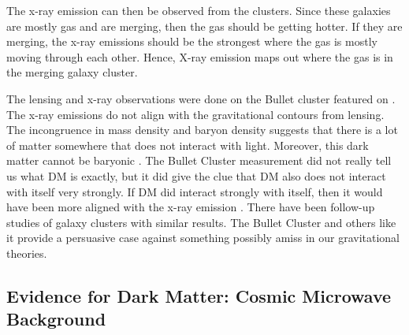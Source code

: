 The x-ray emission can then be observed from the clusters.
Since these galaxies are mostly gas and are merging, then the gas should be getting hotter.
If they are merging, the x-ray emissions should be the strongest where the gas is mostly moving through each other.
Hence, X-ray emission maps out where the gas is in the merging galaxy cluster.

The lensing and x-ray observations were done on the Bullet cluster featured on .
The x-ray emissions do not align with the gravitational contours from lensing.
The incongruence in mass density and baryon density suggests that there is a lot of matter somewhere that does not interact with light.
Moreover, this dark matter cannot be baryonic \cite{Clowe:BulletCluster}.
The Bullet Cluster measurement did not really tell us what DM is exactly, but it did give the clue that DM also does not interact with itself very strongly.
If DM did interact strongly with itself, then it would have been more aligned with the x-ray emission \cite{Clowe:BulletCluster}.
There have been follow-up studies of galaxy clusters with similar results.
The Bullet Cluster and others like it provide a persuasive case against something possibly amiss in our gravitational theories.

\subsection{Evidence for Dark Matter: Cosmic Microwave Background\label{sec:ev4dm_cmb}}


\begin{figure}[ht]
\end{figure}

